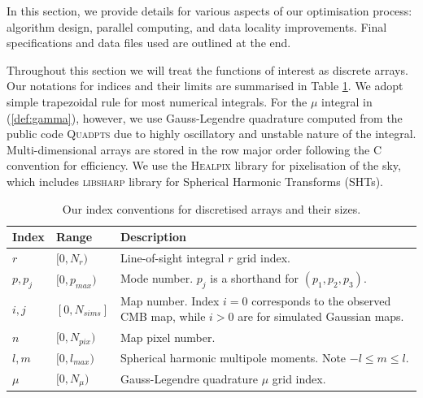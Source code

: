 In this section, we provide details for various aspects of our optimisation process: algorithm design, parallel computing, and data locality improvements. Final specifications and data files used are outlined at the end.

Throughout this section we will treat the functions of interest as discrete arrays. Our notations for indices and their limits are summarised in Table \ref{table:index_conventions}. We adopt simple trapezoidal rule for most numerical integrals. For the $\mu$ integral in (\ref{def:gamma}), however, we use Gauss-Legendre quadrature computed from the public code \textsc{Quadpts} \cite{Hale2013} due to highly oscillatory and unstable nature of the integral. Multi-dimensional arrays are stored in the row major order following the \textsc{C} convention for efficiency. We use the \textsc{Healpix} library \cite{Gorski2005healpix} for pixelisation of the sky, which includes \textsc{libsharp} \cite{Reinecke2013libsharp} library for Spherical Harmonic Transforms (SHTs).

\begin{table}[htbp]
	\caption{Our index conventions for discretised arrays and their sizes.}
	\centering
	\label{table:index_conventions}
	\renewcommand{\arraystretch}{1.5} 
	\begin{tabular}{m{}  m{}  m{}} \toprule
		Index & Range & Description \\
		
		\midrule
		$r$ & $[0, N_r)$ & Line-of-sight integral $r$ grid index. \\
		
		$p, p_j$ & $[0, p_{max})$ & Mode number. $p_j$ is a shorthand for $(p_1, p_2, p_3)$. \\
		
		$i,j$ & $[0, N_{sims}]$ & Map number. Index $i=0$ corresponds to the observed CMB map, while $i>0$ are for simulated Gaussian maps. \\			
		
		$n$ & $[0, N_{pix})$ & Map pixel number. \\ 
		
		$l,m$ & $[0, l_{max})$ & Spherical harmonic multipole moments. Note $-l \le m \le l$. \\
		
		$\mu$ & $[0, N_\mu)$ & Gauss-Legendre quadrature $\mu$ grid index. \\
		
		\bottomrule
	\end{tabular}
\end{table}

